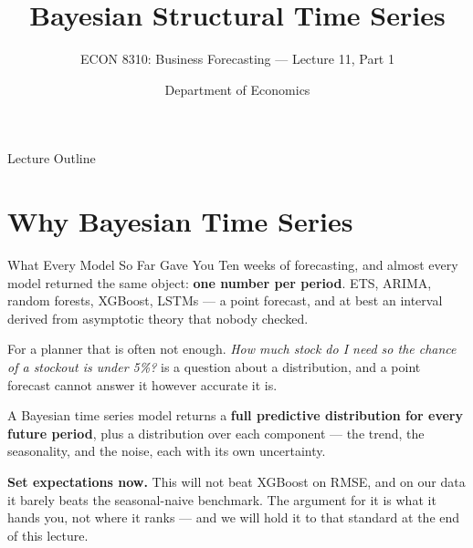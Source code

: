 \documentclass[aspectratio=169, 11pt]{beamer}
\title[Bayesian Time Series]{Bayesian Structural Time Series}
\subtitle{ECON 8310: Business Forecasting --- Lecture 11, Part 1}
\author{Department of Economics}
\institute{University of Nebraska at Omaha}
\begin{document}

\begin{frame}
  \titlepage
\end{frame}

\begin{frame}{Lecture Outline}
  \tableofcontents
\end{frame}

\section{Why Bayesian Time Series}


\begin{frame}{What Every Model So Far Gave You}
  Ten weeks of forecasting, and almost every model returned the same object: \textbf{one number
  per period}. ETS, ARIMA, random forests, XGBoost, LSTMs --- a point forecast, and at best an
  interval derived from asymptotic theory that nobody checked.

  \vspace{0.15cm}
  For a planner that is often not enough. \emph{How much stock do I need so the chance of a
  stockout is under 5\%?} is a question about a distribution, and a point forecast cannot answer
  it however accurate it is.

  \begin{keybox}
    A Bayesian time series model returns a \textbf{full predictive distribution for every future
    period}, plus a distribution over each component --- the trend, the seasonality, and the
    noise, each with its own uncertainty.
  \end{keybox}

  \vspace{0.1cm}
  \textbf{Set expectations now.} This will not beat XGBoost on RMSE, and on our data it barely
  beats the seasonal-naive benchmark. The argument for it is what it hands you, not where it
  ranks --- and we will hold it to that standard at the end of this lecture.
\end{frame}
\end{document}
